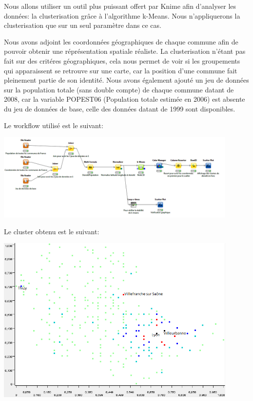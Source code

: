 Nous allons utiliser un outil plus puissant offert par Knime afin d'analyser les données: la clusterisation grâce à l'algorithme k-Means. Nous n'appliquerons la clusterisation que sur un seul paramètre dans ce cas.

Nous avons adjoint les coordonnées géographiques de chaque commune afin de pouvoir obtenir une réprésentation spatiale réaliste. La clusterisation n'étant pas fait sur des critéres géographiques, cela nous permet de voir si les groupements qui apparaissent se retrouve sur une carte, car la position d'une commune fait pleinement partie de son identité.
Nous avons également ajouté un jeu de données sur la population totale (sans double compte) de chaque commune datant de 2008, car la variable POPEST06 (Population totale estimée en 2006) est absente du jeu de données de base, celle des données datant de 1999 sont disponibles. 

Le workflow utilisé est le suivant:

\begin{center}
	\includegraphics[width=0.9\textwidth]{png/Clusterisation_en_fonction_de_la_densité_de_population.png}
\end{center}

Le cluster obtenu est le suivant:

\begin{center}
	\includegraphics[width=0.9\textwidth]{png/Clusters_en_fonction_de_la_densité_de_population.png}
\end{center}

